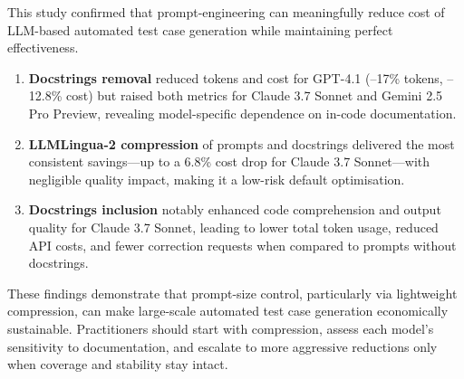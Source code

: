 This study confirmed that prompt-engineering can meaningfully reduce cost of LLM-based automated test case generation while maintaining perfect effectiveness.

\begin{enumerate}
    \item \textbf{Docstrings removal} reduced tokens and cost for GPT-4.1 (–17\% tokens, –12.8\% cost) but raised both metrics for Claude 3.7 Sonnet and Gemini 2.5 Pro Preview, revealing model-specific dependence on in-code documentation.
    \vspace{0.3cm}
    
    \item \textbf{LLMLingua-2 compression} of prompts and docstrings delivered the most consistent savings—up to a 6.8\% cost drop for Claude 3.7 Sonnet—with negligible quality impact, making it a low-risk default optimisation.
    \vspace{0.3cm}
    
    \item \textbf{Docstrings inclusion} notably enhanced code comprehension and output quality for Claude 3.7 Sonnet, leading to lower total token usage, reduced API costs, and fewer correction requests when compared to prompts without docstrings.
\end{enumerate}


These findings demonstrate that prompt-size control, particularly via lightweight compression, can make large-scale automated test case generation economically sustainable. Practitioners should start with compression, assess each model’s sensitivity to documentation, and escalate to more aggressive reductions only when coverage and stability stay intact.
